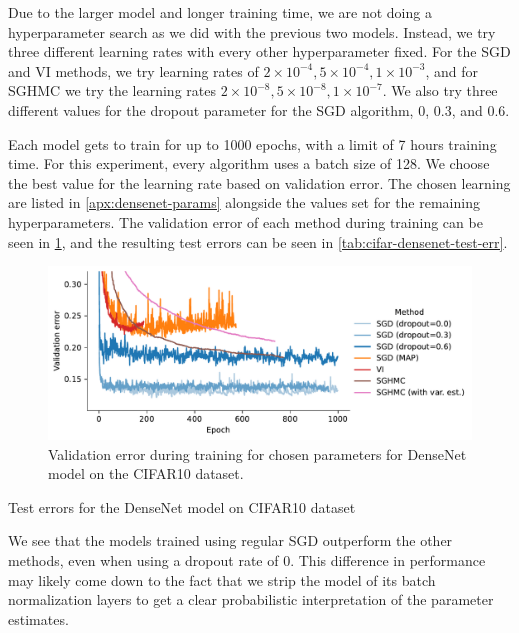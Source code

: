 Due to the larger model and longer training time, we are not doing a hyperparameter search as we did with the previous two models.
Instead, we try three different learning rates with every other hyperparameter fixed.
For the SGD and VI methods, we try learning rates of $2\times 10^{-4},5\times 10^{-4},1\times 10^{-3}$, and for SGHMC we try the learning rates $2\times 10^{-8},5\times 10^{-8},1 \times 10^{-7}$. 
We also try three different values for the dropout parameter for the SGD algorithm, $0$, $0.3$, and $0.6$.

Each model gets to train for up to 1000 epochs, with a limit of 7 hours training time.
For this experiment, every algorithm uses a batch size of 128.
We choose the best value for the learning rate based on validation error.
The chosen learning are listed in \cref{apx:densenet-params} alongside the values set for the remaining hyperparameters. 
The validation error of each method during training can be seen in \cref{fig:cifar-densenet-val-err}, and the resulting test errors can be seen in \cref{tab:cifar-densenet-test-err}.
\begin{figure}[htbp]
    \centering
    \includegraphics[width=\linewidth]{Figures/cifar-densenet-final-runs-val.pdf}
    \caption{Validation error during training for chosen parameters for DenseNet model on the CIFAR10 dataset.}
    \label{fig:cifar-densenet-val-err}
\end{figure}
\begin{table}[htbp]
    \centering
    
    \caption{Test errors for the DenseNet model on CIFAR10 dataset}
    \label{tab:cifar-densenet-test-err}
\end{table}
We see that the models trained using regular SGD outperform the other methods, even when using a dropout rate of 0. 
This difference in performance may likely come down to the fact that we strip the model of its batch normalization layers to get a clear probabilistic interpretation of the parameter estimates.

